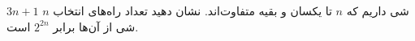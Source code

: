 \EXERCISE
$3n + 1$
شی داریم که
$n$
تا یکسان و بقیه متفاوت‌اند. نشان دهید تعداد را‌ه‌های انتخاب
$n$
شی از آن‌ها برابر
$2^{2n}$
است.